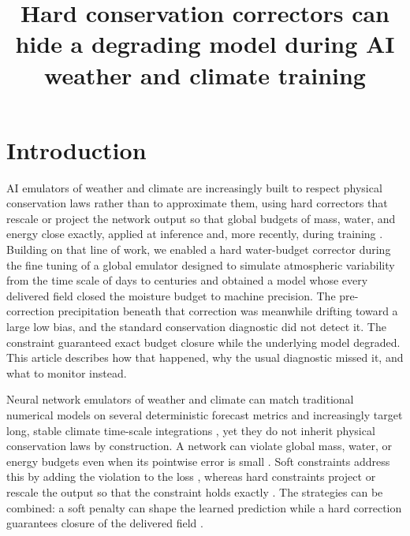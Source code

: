 \documentclass{ametsocV6.1}
\title{Hard conservation correctors can hide a degrading model during AI weather and climate training}
\affiliation{\aff{a}{Department of Atmospheric and Oceanic Sciences, University of Colorado Boulder, Boulder, Colorado}
\aff{b}{NSF National Center for Atmospheric Research, Boulder, Colorado}}
\begin{document}
\maketitle

\section{Introduction}\label{sec:intro}

AI emulators of weather and climate are increasingly built to respect physical conservation laws rather than to approximate them, using hard correctors that rescale or project the network output so that global budgets of mass, water, and energy close exactly, applied at inference and, more recently, during training \citep{wattmeyer2025, sha2025, gregory2026floenet, chapman2025camulator}. Building on that line of work, we enabled a hard water-budget corrector during the fine tuning of a global emulator designed to simulate atmospheric variability from the time scale of days to centuries and obtained a model whose every delivered field closed the moisture budget to machine precision. The pre-correction precipitation beneath that correction was meanwhile drifting toward a large low bias, and the standard conservation diagnostic did not detect it. The constraint guaranteed exact budget closure while the underlying model degraded. This article describes how that happened, why the usual diagnostic missed it, and what to monitor instead.

Neural network emulators of weather and climate can match traditional numerical models on several deterministic forecast metrics \citep[e.g.,][]{bi2023,lam2023,kochkov2024} and increasingly target long, stable climate time-scale integrations \citep[e.g.,][]{bonev2023sfno, karlbauer2024healpix, wattmeyer2025, chapman2025camulator}, yet they do not inherit physical conservation laws by construction. A network can violate global mass, water, or energy budgets even when its pointwise error is small \citep{beucler2021,sha2025}. Soft constraints address this by adding the violation to the loss \citep{raissi2019physicsinformed,karniadakis2021physicsinformed,beucler2021}, whereas hard constraints project or rescale the output so that the constraint holds exactly \citep{beucler2021,zanetta2023,valente2025,harder2023hardconstrained,wattmeyer2025,sha2025}. The strategies can be combined: a soft penalty can shape the learned prediction while a hard correction guarantees closure of the delivered field \citep{beucler2021}.
\end{document}
